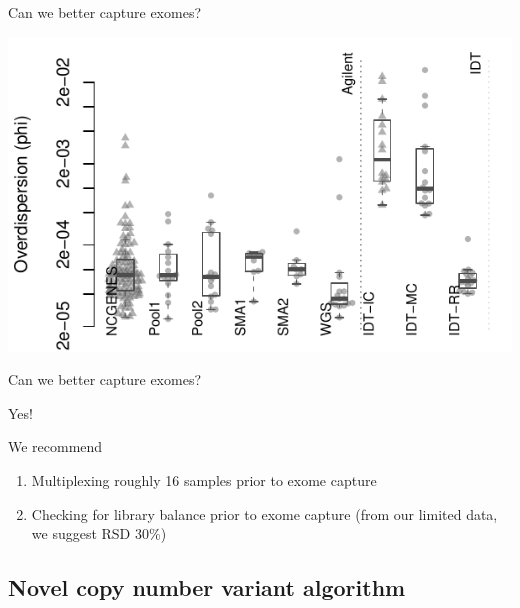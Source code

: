 \documentclass[
  10pt,
  ignorenonframetext,
  m]{beamer}
\begin{document}
\begin{frame}{Can we better capture exomes?}
\protect\hypertarget{can-we-better-capture-exomes-7}{}

\begin{center}\includegraphics{defense_files/figure-beamer/overallPhi-1} \end{center}

\end{frame}

\begin{frame}{Can we better capture exomes?}
\protect\hypertarget{can-we-better-capture-exomes-8}{}

\bigskip

\centering\Huge\textcolor{uncnavy}{Yes!}

\bigskip
\raggedright\normalsize

\begin{block}{We recommend}

\begin{enumerate}
\item
  Multiplexing roughly 16 samples prior to exome capture
\item
  Checking for library balance prior to exome capture (from our limited
  data, we suggest RSD 30\%)
\end{enumerate}

\end{block}

\end{frame}

\hypertarget{novel-copy-number-variant-algorithm}{%
\subsection{Novel copy number variant
algorithm}\label{novel-copy-number-variant-algorithm}}
\end{document}
